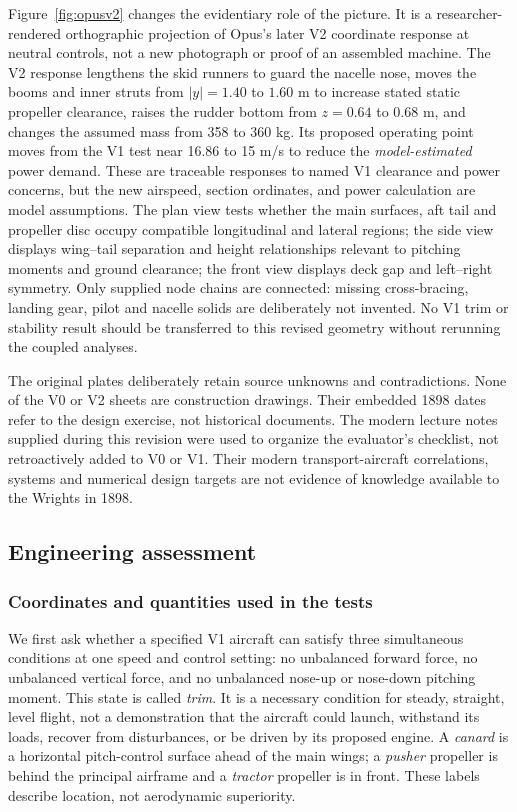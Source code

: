 \documentclass[11pt,a4paper]{article}
\begin{document}
Figure~\ref{fig:opusv2} changes the evidentiary role of the picture. It is a researcher-rendered orthographic projection of Opus's later V2 coordinate response at neutral controls, not a new photograph or proof of an assembled machine. The V2 response lengthens the skid runners to guard the nacelle nose, moves the booms and inner struts from $|y|=1.40$ to $1.60$ m to increase stated static propeller clearance, raises the rudder bottom from $z=0.64$ to $0.68$ m, and changes the assumed mass from 358 to 360 kg. Its proposed operating point moves from the V1 test near 16.86 to 15 m/s to reduce the \emph{model-estimated} power demand. These are traceable responses to named V1 clearance and power concerns, but the new airspeed, section ordinates, and power calculation are model assumptions. The plan view tests whether the main surfaces, aft tail and propeller disc occupy compatible longitudinal and lateral regions; the side view displays wing--tail separation and height relationships relevant to pitching moments and ground clearance; the front view displays deck gap and left--right symmetry. Only supplied node chains are connected: missing cross-bracing, landing gear, pilot and nacelle solids are deliberately not invented. No V1 trim or stability result should be transferred to this revised geometry without rerunning the coupled analyses.

The original plates deliberately retain source unknowns and contradictions. None of the V0 or V2 sheets are construction drawings. Their embedded 1898 dates refer to the design exercise, not historical documents. The modern lecture notes supplied during this revision were used to organize the evaluator's checklist, not retroactively added to V0 or V1. Their modern transport-aircraft correlations, systems and numerical design targets are not evidence of knowledge available to the Wrights in 1898.

\subsection{Engineering assessment}
\subsubsection{Coordinates and quantities used in the tests}
We first ask whether a specified V1 aircraft can satisfy three simultaneous conditions at one speed and control setting: no unbalanced forward force, no unbalanced vertical force, and no unbalanced nose-up or nose-down pitching moment. This state is called \emph{trim}. It is a necessary condition for steady, straight, level flight, not a demonstration that the aircraft could launch, withstand its loads, recover from disturbances, or be driven by its proposed engine. A \emph{canard} is a horizontal pitch-control surface ahead of the main wings; a \emph{pusher} propeller is behind the principal airframe and a \emph{tractor} propeller is in front. These labels describe location, not aerodynamic superiority.
\end{document}
